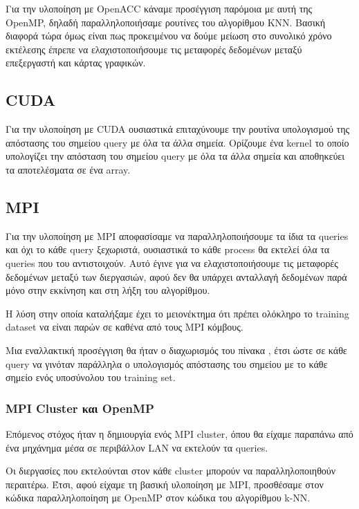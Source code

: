 \documentclass[11pt]{scrartcl} %
\begin{document}
Για την υλοποίηση με OpenACC κάναμε προσέγγιση παρόμοια με αυτή της OpenMP, δηλαδή
παραλληλοποιήσαμε ρουτίνες του αλγορίθμου KNN. 
Βασική διαφορά τώρα όμως είναι πως προκειμένου να δούμε μείωση στο συνολικό χρόνο εκτέλεσης έπρεπε 
να ελαχιστοποιήσουμε τις μεταφορές δεδομένων μεταξύ επεξεργαστή και κάρτας γραφικών.

\subsection{CUDA}

Για την υλοποίηση με CUDA ουσιαστικά επιταχύνουμε την ρουτίνα υπολογισμού της απόστασης του σημείου
query με όλα τα άλλα σημεία.
Ορίζουμε ένα kernel  το οποίο υπολογίζει την απόσταση του σημείου query με όλα τα άλλα σημεία 
και αποθηκεύει τα αποτελέσματα σε ένα array.

\subsection{MPI}

Για την υλοποίηση με MPI αποφασίσαμε να παραλληλοποιήσουμε τα ίδια τα queries και όχι το κάθε query ξεχωριστά, 
ουσιαστικά το κάθε process θα εκτελεί όλα τα queries που του αντιστοιχούν.
Αυτό έγινε για να ελαχιστοποιήσουμε τις μεταφορές δεδομένων μεταξύ των διεργασιών, αφού δεν θα υπάρχει ανταλλαγή δεδομένων παρά μόνο στην εκκίνηση και στη λήξη του αλγορίθμου.

Η λύση στην οποία καταλήξαμε έχει το μειονέκτημα ότι πρέπει ολόκληρο το training dataset να είναι παρών σε καθένα από 
τους MPI κόμβους.

Μια εναλλακτική προσέγγιση θα ήταν ο διαχωρισμός του πίνακα , έτσι ώστε σε κάθε query
να γινόταν παράλληλα ο υπολογισμός απόστασης του σημείου  με το κάθε σημείο ενός υποσύνολου του training set.

\subsubsection{MPI Cluster και OpenMP}

Επόμενος στόχος ήταν η δημιουργία ενός MPI cluster, όπου θα είχαμε παραπάνω από ένα μηχάνημα μέσα σε περιβάλλον LAN να εκτελούν τα queries.

Οι διεργασίες που εκτελούνται στον κάθε cluster μπορούν να παραλληλοποιηθούν περαιτέρω.
Έτσι, αφού είχαμε τη βασική υλοποίηση με MPI, προσθέσαμε στον κώδικα παραλληλοποίηση με OpenMP στον κώδικα του αλγορίθμου k-NN.
\end{document}
